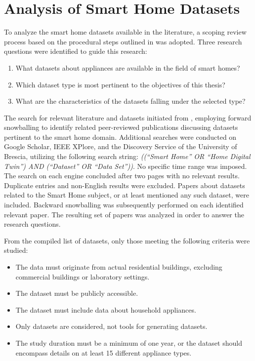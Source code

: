 \chapter{Analysis of Smart Home Datasets}\label{ch:datasets}

To analyze the smart home datasets available in the literature, a scoping review process based on the procedural steps outlined in \parencite{makStepsConductingScoping2022} was adopted. Three research questions were identified to guide this research:
\begin{enumerate}[label={RQ\arabic*.}, leftmargin=3.5em]
    \item What datasets about appliances are available in the field of smart homes?
    \item Which dataset type is most pertinent to the objectives of this thesis?
    \item What are the characteristics of the datasets falling under the selected type?
\end{enumerate}

The search for relevant literature and datasets initiated from \parencite{barkerSmartOpenData2012}, employing forward snowballing to identify related peer-reviewed publications discussing datasets pertinent to the smart home domain. Additional searches were conducted on Google Scholar, IEEE XPlore, and the Discovery Service of the University of Brescia, utilizing the following search string: \textit{((``Smart Home'' OR ``Home Digital Twin'') AND (``Dataset'' OR ``Data Set''))}. No specific time range was imposed. The search on each engine concluded after two pages with no relevant results. Duplicate entries and non-English results were excluded. Papers about datasets related to the Smart Home subject, or at least mentioned any such dataset, were included. Backward snowballing was subsequently performed on each identified relevant paper. The resulting set of papers was analyzed in order to answer the research questions.

From the compiled list of datasets, only those meeting the following criteria were studied:
\begin{itemize}
    \item The data must originate from actual residential buildings, excluding commercial buildings or laboratory settings.
    \item The dataset must be publicly accessible.
    \item The dataset must include data about household appliances.
    \item Only datasets are considered, not tools for generating datasets.
    \item The study duration must be a minimum of one year, or the dataset should encompass details on at least 15 different appliance types.
\end{itemize}

